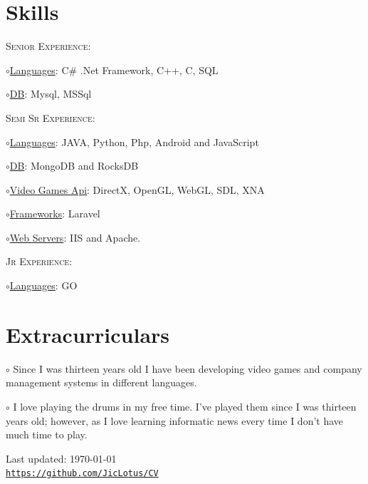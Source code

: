 \documentclass[letterpaper]{article}
\def\footerlink{https://github.com/JicLotus/CV}
\renewenvironment{itemize}{
  \begin{list}{}{
    \setlength{\leftmargin}{1.5em}
  }
}{
  \end{list}
}
\newenvironment{no-indent-itemize}{
  \begin{list}{}{
    \setlength{\leftmargin}{0em}
  }
}{
  \end{list}
}
\def\bullet{$\circ$\xspace}
\begin{document}
\section*{Skills}
\begin{no-indent-itemize}
    
    \item\textsc{Senior Experience}:
    \begin{itemize}
        \item\bullet \underline{Languages}: C\# .Net Framework, C++, C, SQL
        \item\bullet \underline{DB}: Mysql, MSSql
    \end{itemize} 
    \item \textsc{Semi Sr Experience}:
    \begin{itemize}
        \item\bullet \underline{Languages}: JAVA, Python, Php, Android and JavaScript
        \item\bullet \underline{DB}: MongoDB and RocksDB
        \item\bullet \underline{Video Games Api}: DirectX, OpenGL, WebGL, SDL, XNA
        \item\bullet \underline{Frameworks}: Laravel
        \item\bullet \underline{Web Servers}: IIS and Apache.
    \end{itemize}     
    \item \textsc{Jr Experience}:
    \begin{itemize}
        \item\bullet \underline{Languages}: GO
    \end{itemize}      

\end{no-indent-itemize}



\section*{Extracurriculars}
\begin{no-indent-itemize}
    \item\bullet Since I was thirteen years old I have been developing video games and company management systems in different languages. 
    \item\bullet I love playing the drums in my free time. I've played them since I was thirteen years old; however,  as I love learning informatic news every time I don't have much time to play.
\end{no-indent-itemize}






\bigskip
\begin{center}
  \begin{footnotesize}
    Last updated: \today \\
    \href{\footerlink}{\texttt{\footerlink}}
  \end{footnotesize}
\end{center}
\end{document}
